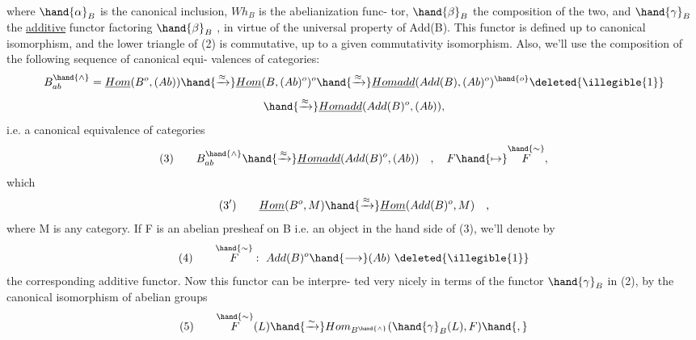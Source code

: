 where $\hand{\alpha}_B$ is the canonical inclusion, $Wh_B$ is the abelianization func-%
tor, $\hand{\beta}_B$ the composition of the two, and $\hand{\gamma}_B$ the \uline{additive} functor
factoring $\hand{\beta}_B$ , in virtue of the universal property of Add(B). This
functor is defined up to canonical isomorphism, and the lower triangle
of (2) is commutative, up to a given commutativity isomorphism. Also,
we'll use the composition of the following sequence of canonical equi-%
valences of categories:
\[ B^{\hand{\wedge}}_{ab} = \underline{Hom}(B^{o},(Ab)) \hand{\xrightarrow{\approx}} \underline{Hom}(B,(Ab)^{o})^{o} \hand{\xrightarrow{\approx}} \underline{Homadd}(Add(B),(Ab)^{o})^{\hand{o}}\deleted{\illegible{1}} \]
\[ \hand{\xrightarrow{\approx}} \underline{Homadd}(Add(B)^{o},(Ab)) , \]
i.e. a canonical equivalence of categories
\[ (3) \qquad B^{\hand{\wedge}}_{ab} \hand{\xrightarrow{\approx}} \underline{Homadd}(Add(B)^{o}, (Ab)) \quad , \quad F \hand{\mapsto} \overset{\hand{\sim}}{F} , \]
which   
\[ (3') \qquad \underline{Hom}(B^{o}, M) \hand{\xrightarrow{\approx}} \underline{Hom}(Add(B)^{o}, M ) \quad , \]
where M is any   category. If F is an abelian presheaf on B
i.e. an object in the   hand side of (3), we'll denote by
\[ (4) \qquad \overset{\hand{\sim}}{F} : \ Add(B)^{o} \hand{\longrightarrow} (Ab) \ \deleted{\illegible{1}} \]
the corresponding additive functor. Now this functor can be interpre-%
ted very nicely in terms of the functor $\hand{\gamma}_B$ in (2), by the canonical
isomorphism of abelian groups
\[ (5) \qquad \overset{\hand{\sim}}{F}(L) \hand{\xrightarrow{\sim}} Hom_{B^{\hand{\wedge}}}(\hand{\gamma}_B(L),F)\hand{,} \]


